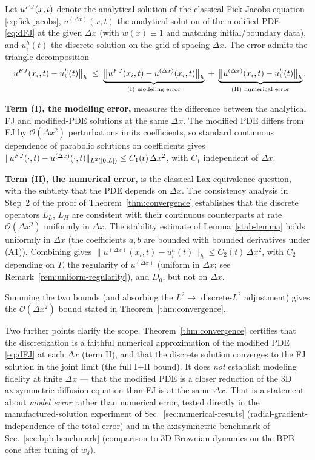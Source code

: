 \documentclass[11pt]{article}
\begin{document}
Let $u^{\rm FJ}(x, t)$ denote the analytical solution of the classical Fick-Jacobs equation \eqref{eq:fick-jacobs}, $u^{(\Delta x)}(x, t)$ the analytical solution of the modified PDE \eqref{eq:dFJ} at the given $\Delta x$ (with $w(x) \equiv 1$ and matching initial/boundary data), and $u^h_i(t)$ the discrete solution on the grid of spacing $\Delta x$. The error admits the triangle decomposition
\begin{equation}
    \big\| u^{\rm FJ}(x_i, t) - u^h_i(t) \big\|_h \;\leq\; \underbrace{\big\| u^{\rm FJ}(x_i, t) - u^{(\Delta x)}(x_i, t) \big\|_h}_{\text{(I) modeling error}} \;+\; \underbrace{\big\| u^{(\Delta x)}(x_i, t) - u^h_i(t) \big\|_h}_{\text{(II) numerical error}}. \label{eq:triangle-decomp}
\end{equation}

\textbf{Term (I), the modeling error,} measures the difference between the analytical FJ and modified-PDE solutions at the same $\Delta x$. The modified PDE differs from FJ by $\mathcal{O}(\Delta x^2)$ perturbations in its coefficients, so standard continuous dependence of parabolic solutions on coefficients \cite{ThomasTAM22} gives $\| u^{\rm FJ}(\cdot, t) - u^{(\Delta x)}(\cdot, t) \|_{L^2([0,L])} \leq C_1(t)\, \Delta x^2$, with $C_1$ independent of $\Delta x$.

\textbf{Term (II), the numerical error,} is the classical Lax-equivalence question, with the subtlety that the PDE depends on $\Delta x$. The consistency analysis in Step~2 of the proof of Theorem~\ref{thm:convergence} establishes that the discrete operators $L_L$, $L_H$ are consistent with their continuous counterparts at rate $\mathcal{O}(\Delta x^2)$ uniformly in $\Delta x$. The stability estimate of Lemma~\ref{stab-lemma} holds uniformly in $\Delta x$ (the coefficients $a, b$ are bounded with bounded derivatives under (A1)). Combining gives $\| u^{(\Delta x)}(x_i, t) - u^h_i(t) \|_h \leq C_2(t)\, \Delta x^2$, with $C_2$ depending on $T$, the regularity of $u^{(\Delta x)}$ (uniform in $\Delta x$; see Remark~\ref{rem:uniform-regularity}), and $D_0$, but not on $\Delta x$.

Summing the two bounds (and absorbing the $L^2 \to$ discrete-$L^2$ adjustment) gives the $\mathcal{O}(\Delta x^2)$ bound stated in Theorem~\ref{thm:convergence}.

Two further points clarify the scope. Theorem~\ref{thm:convergence} certifies that the discretization is a faithful numerical approximation of the modified PDE \eqref{eq:dFJ} at each $\Delta x$ (term II), and that the discrete solution converges to the FJ solution in the joint limit (the full I+II bound). It does \emph{not} establish modeling fidelity at finite $\Delta x$ --- that the modified PDE is a closer reduction of the 3D axisymmetric diffusion equation than FJ is at the same $\Delta x$. That is a statement about \emph{model error} rather than numerical error, tested directly in the manufactured-solution experiment of Sec.~\ref{sec:numerical-results} (radial-gradient-independence of the total error) and in the axisymmetric benchmark of Sec.~\ref{sec:bpb-benchmark} (comparison to 3D Brownian dynamics on the BPB cone after tuning of $w_\delta$).
\end{document}
